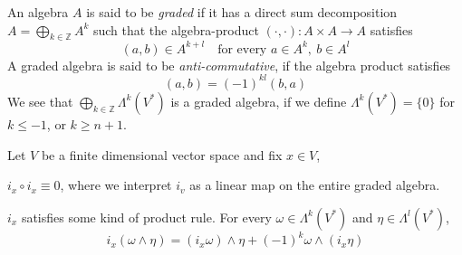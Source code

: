 \documentclass[../main-manifolds.tex]{subfiles}
\begin{document}
\begin{definition}
    An algebra $A$ is said to be \emph{graded} if it has a direct sum decomposition $A = \bigoplus_{k\in \mathbb{Z}}A^k$ such that the algebra-product $(\cdot,\cdot): A\times A\to A$ satisfies 
    \[
        (a,b)\in A^{k+l}\quad\text{for every }a\in A^k,\: b\in A^l
    \]
    A graded algebra is said to be \emph{anti-commutative}, if the algebra product satisfies
    \[
        (a,b) = (-1)^{kl}(b,a)
    \]
    We see that $\bigoplus_{k\in \mathbb{Z}}\Lambda^k(V^*)$ is a graded algebra, if we define $\Lambda^k(V^*)=\{0\}$ for $k\leq -1$, or $k\geq n+1$. 

\end{definition}

\begin{wts}
    Let $V$ be a finite dimensional vector space and fix $x\in V$,
    \begin{enumroman}
        \item $i_x\circ i_x\equiv 0$, where we interpret $i_v$ as a linear map on the entire graded algebra.
        \item $i_x$ satisfies some kind of product rule. For every $\omega\in \Lambda^k(V^*)$ and $\eta\in\Lambda^l(V^*)$,
        \[
            i_x(\omega\wedge\eta) = (i_x\omega)\wedge\eta + (-1)^{k}\omega\wedge(i_x\eta)
        \]
    \end{enumroman}
\end{wts}
\end{document}
